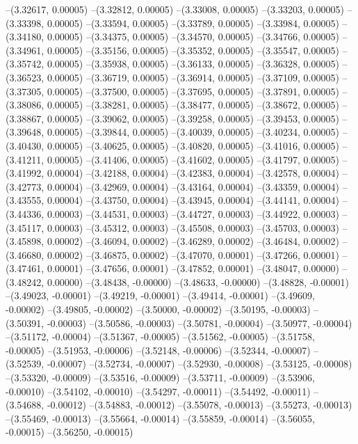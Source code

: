 --(3.32617, 0.00005)
--(3.32812, 0.00005)
--(3.33008, 0.00005)
--(3.33203, 0.00005)
--(3.33398, 0.00005)
--(3.33594, 0.00005)
--(3.33789, 0.00005)
--(3.33984, 0.00005)
--(3.34180, 0.00005)
--(3.34375, 0.00005)
--(3.34570, 0.00005)
--(3.34766, 0.00005)
--(3.34961, 0.00005)
--(3.35156, 0.00005)
--(3.35352, 0.00005)
--(3.35547, 0.00005)
--(3.35742, 0.00005)
--(3.35938, 0.00005)
--(3.36133, 0.00005)
--(3.36328, 0.00005)
--(3.36523, 0.00005)
--(3.36719, 0.00005)
--(3.36914, 0.00005)
--(3.37109, 0.00005)
--(3.37305, 0.00005)
--(3.37500, 0.00005)
--(3.37695, 0.00005)
--(3.37891, 0.00005)
--(3.38086, 0.00005)
--(3.38281, 0.00005)
--(3.38477, 0.00005)
--(3.38672, 0.00005)
--(3.38867, 0.00005)
--(3.39062, 0.00005)
--(3.39258, 0.00005)
--(3.39453, 0.00005)
--(3.39648, 0.00005)
--(3.39844, 0.00005)
--(3.40039, 0.00005)
--(3.40234, 0.00005)
--(3.40430, 0.00005)
--(3.40625, 0.00005)
--(3.40820, 0.00005)
--(3.41016, 0.00005)
--(3.41211, 0.00005)
--(3.41406, 0.00005)
--(3.41602, 0.00005)
--(3.41797, 0.00005)
--(3.41992, 0.00004)
--(3.42188, 0.00004)
--(3.42383, 0.00004)
--(3.42578, 0.00004)
--(3.42773, 0.00004)
--(3.42969, 0.00004)
--(3.43164, 0.00004)
--(3.43359, 0.00004)
--(3.43555, 0.00004)
--(3.43750, 0.00004)
--(3.43945, 0.00004)
--(3.44141, 0.00004)
--(3.44336, 0.00003)
--(3.44531, 0.00003)
--(3.44727, 0.00003)
--(3.44922, 0.00003)
--(3.45117, 0.00003)
--(3.45312, 0.00003)
--(3.45508, 0.00003)
--(3.45703, 0.00003)
--(3.45898, 0.00002)
--(3.46094, 0.00002)
--(3.46289, 0.00002)
--(3.46484, 0.00002)
--(3.46680, 0.00002)
--(3.46875, 0.00002)
--(3.47070, 0.00001)
--(3.47266, 0.00001)
--(3.47461, 0.00001)
--(3.47656, 0.00001)
--(3.47852, 0.00001)
--(3.48047, 0.00000)
--(3.48242, 0.00000)
--(3.48438, -0.00000)
--(3.48633, -0.00000)
--(3.48828, -0.00001)
--(3.49023, -0.00001)
--(3.49219, -0.00001)
--(3.49414, -0.00001)
--(3.49609, -0.00002)
--(3.49805, -0.00002)
--(3.50000, -0.00002)
--(3.50195, -0.00003)
--(3.50391, -0.00003)
--(3.50586, -0.00003)
--(3.50781, -0.00004)
--(3.50977, -0.00004)
--(3.51172, -0.00004)
--(3.51367, -0.00005)
--(3.51562, -0.00005)
--(3.51758, -0.00005)
--(3.51953, -0.00006)
--(3.52148, -0.00006)
--(3.52344, -0.00007)
--(3.52539, -0.00007)
--(3.52734, -0.00007)
--(3.52930, -0.00008)
--(3.53125, -0.00008)
--(3.53320, -0.00009)
--(3.53516, -0.00009)
--(3.53711, -0.00009)
--(3.53906, -0.00010)
--(3.54102, -0.00010)
--(3.54297, -0.00011)
--(3.54492, -0.00011)
--(3.54688, -0.00012)
--(3.54883, -0.00012)
--(3.55078, -0.00013)
--(3.55273, -0.00013)
--(3.55469, -0.00013)
--(3.55664, -0.00014)
--(3.55859, -0.00014)
--(3.56055, -0.00015)
--(3.56250, -0.00015)
